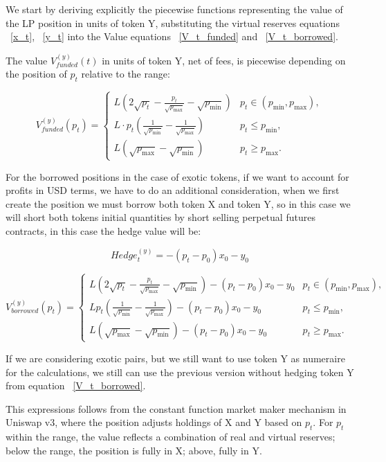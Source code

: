 \documentclass{article}
\begin{document}
We start by deriving explicitly the piecewise functions representing the value of the LP position in units of token Y, substituting the virtual reserves equations ~\eqref{x_t}, ~\eqref{y_t} into the Value equations ~\eqref{V_t_funded} and ~\eqref{V_t_borrowed}.

The value \(V_{funded}^{(y)}(t)\) in units of token Y, net of fees, is piecewise depending on the position of \(p_t\) relative to the range:

\begin{equation}
V_{funded}^{(y)}(p_t) = 
\begin{cases} 
L \left( 2 \sqrt{p_t} - \frac{p_t}{\sqrt{p_{\max}}} - \sqrt{p_{\min}} \right) & p_t \in (p_{\min}, p_{\max}), \\
L \cdot p_t \left( \frac{1}{\sqrt{p_{\min}}} - \frac{1}{\sqrt{p_{\max}}} \right) & p_t \leq p_{\min}, \\
L \left( \sqrt{p_{\max}} - \sqrt{p_{\min}} \right) & p_t \geq p_{\max}.
\end{cases}
\end{equation}

For the borrowed positions in the case of exotic tokens, if we want to account for profits in USD terms, we have to do an additional consideration, when we first create the position we must borrow both token X and token Y, so in this case we will short both tokens initial quantities by short selling perpetual futures contracts, in this case the hedge value will be:

$$Hedge_t^{(y)} = -(p_t - p_0)x_0 - y_0$$

\begin{equation}
V_{borrowed}^{(y)}(p_t) = 
\begin{cases} 
L \left( 2 \sqrt{p_t} - \frac{p_t}{\sqrt{p_{\max}}} - \sqrt{p_{\min}} \right) - (p_t - p_0)x_0- y_0 & p_t \in (p_{\min}, p_{\max}), \\
L p_t \left( \frac{1}{\sqrt{p_{\min}}} - \frac{1}{\sqrt{p_{\max}}} \right)  - (p_t - p_0)x_0 - y_0 & p_t \leq p_{\min}, \\
L \left( \sqrt{p_{\max}} - \sqrt{p_{\min}} \right)  - (p_t - p_0)x_0 - y_0 & p_t \geq p_{\max}.
\end{cases}
\end{equation}

If we are considering exotic pairs, but we still want to use token Y as numeraire for the calculations, we still can use the previous version without hedging token Y from equation ~\eqref{V_t_borrowed}.

This expressions follows from the constant function market maker mechanism in Uniswap v3, where the position adjusts holdings of X and Y based on \(p_t\). For \(p_t\) within the range, the value reflects a combination of real and virtual reserves; below the range, the position is fully in X; above, fully in Y.
\end{document}
